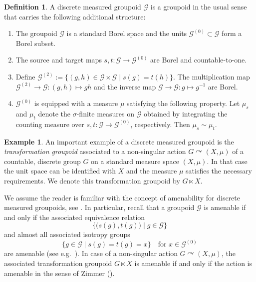 \documentclass[11pt,a4paper]{article}
\theoremstyle{definition}
\newtheorem{example}[theorem]{Example}
\newtheorem{definition}[theorem]{Definition}
\theoremstyle{remark}
\numberwithin{equation}{section}
\numberwithin{theorem}{section}
\newcommand{\acts}{\curvearrowright}
\begin{document}
\begin{definition}A discrete measured groupoid $\mathcal{G}$ is a groupoid in the usual sense that carries the following additional structure:
\begin{enumerate}[label=$\bullet$,leftmargin=*]
\item The groupoid $\mathcal{G}$ is a standard Borel space and the units $\mathcal{G}^{(0)} \subset \mathcal{G}$ form a Borel subset.
\item The source and target maps $s,t\colon \mathcal{G} \rightarrow \mathcal{G}^{(0)}$ are Borel and countable-to-one.
\item Define $\mathcal{G}^{(2)}:= \{(g,h) \in \mathcal{G} \times \mathcal{G} \mid s(g) = t(h)\}.$ The multiplication map $\mathcal{G}^{(2)} \rightarrow \mathcal{G}\colon (g,h) \mapsto gh$ and the inverse map $\mathcal{G}\rightarrow \mathcal{G}\colon g \mapsto g^{-1}$ are Borel.
\item $\mathcal{G}^{(0)}$ is equipped with a measure $\mu$ satisfying the following property.
Let $\mu_s$ and $\mu_t$ denote the $\sigma$-finite measures on $\mathcal{G}$ obtained by integrating the counting measure over $s,t\colon \mathcal{G}\rightarrow \mathcal{G}^{(0)}$, respectively. Then $\mu_s \sim \mu_t$. 
\end{enumerate}
\end{definition}
\begin{example}
An important example of a discrete measured groupoid is the \emph{transformation groupoid} associated to a non-singular action $G \acts (X, \mu)$ of a countable, discrete group $G$ on a standard measure space $(X, \mu)$. In that case the unit space can be identified with $X$ and the measure $\mu$ satisfies the necessary requirements. We denote this transformation groupoid by $G \ltimes X$. 
\end{example}
We assume the reader is familiar with the concept of amenability for discrete measured groupoids, see \cite[Definition 3.2.8]{AnantharamanRenault00}. In particular, recall that a groupoid $\mathcal{G}$ is amenable if and only if the associated equivalence relation
\[
\big\{ \big( s(g),t(g) \big) \mid g \in \mathcal{G} \big\}
\]
and almost all associated isotropy groups
\[\{g \in \mathcal{G} \mid s(g) = t(g) = x\} \quad \text{for } x \in \mathcal{G}^{(0)}\]
are amenable (see e.g.\ \cite[Corollary 5.3.33]{AnantharamanRenault00}). 
In case of a non-singular action $G \acts (X, \mu)$, the associated transformation groupoid $G \ltimes X$ is amenable if and only if the action is amenable in the sense of Zimmer (\cite{Zimmer78, Zimmer77, Zimmer77b}).
\end{document}
